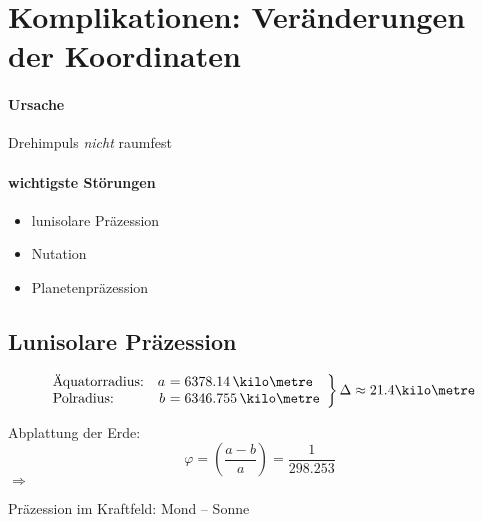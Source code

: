 \section{Komplikationen: Veränderungen der Koordinaten}
\paragraph{Ursache} Drehimpuls \emph{nicht} raumfest
\paragraph{wichtigste Störungen}
\begin{itemize}
    \item lunisolare Präzession
    \item Nutation
    \item Planetenpräzession
\end{itemize}

\subsection{Lunisolare Präzession}
\[
    \left.
    \begin{array}{lr@{\ }l}
        \text{Äquatorradius:} & a &= 6378.14\,\kilo\metre \\
        \text{Polradius:} & b &= 6346.755\,\kilo\metre
    \end{array}
    \right\} \Delta \approx 21.4 \kilo\metre
\]

Abplattung der Erde:
\[ \varphi = \left(\frac{a - b}{a}\right) = \frac{1}{298.253} \]
$\Rightarrow$ 

Präzession im Kraftfeld: Mond --  Sonne

